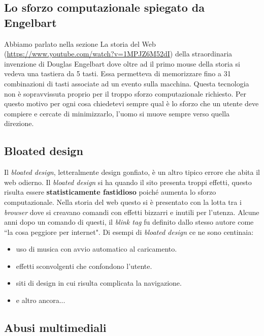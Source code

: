 		\subsection{Lo sforzo computazionale spiegato da Engelbart}
			Abbiamo parlato nella sezione La storia del Web (\url{https://www.youtube.com/watch?v=1MPJZ6M52dI}) della straordinaria invenzione di Douglas Engelbart dove oltre ad il primo mouse della storia si vedeva una tastiera da 5 tasti. Essa permetteva di memorizzare fino a 31 combinazioni di tasti associate ad un evento sulla macchina. Questa tecnologia non è sopravvissuta proprio per il troppo sforzo computazionale richiesto. Per questo motivo per ogni cosa chiedetevi sempre qual è lo sforzo che un utente deve compiere e cercate di minimizzarlo, l'uomo si muove sempre verso quella direzione.
		
		\subsection{Bloated design}
			Il \emph{bloated design}, letteralmente design gonfiato, è un altro tipico errore che abita il web odierno. Il \emph{bloated design} si ha quando il sito presenta troppi effetti, questo risulta essere \textbf{statisticamente fastidioso} poiché aumenta lo sforzo computazionale.
			Nella storia del web questo si è presentato con la lotta tra i \emph{browser} dove si creavano comandi con effetti bizzarri e inutili per l'utenza. Alcune anni dopo un comando di questi, il \emph{blink tag} fu definito dallo stesso autore come ``la cosa peggiore per internet".
			Di esempi di \emph{bloated design} ce ne sono centinaia:
			\begin{itemize}
				\item uso di musica con avvio automatico al caricamento.
				\item effetti sconvolgenti che confondono l'utente.
				\item siti di design in cui risulta complicata la navigazione.
				\item e altro ancora...
			\end{itemize}
		
		\subsection{Abusi multimediali}
			
